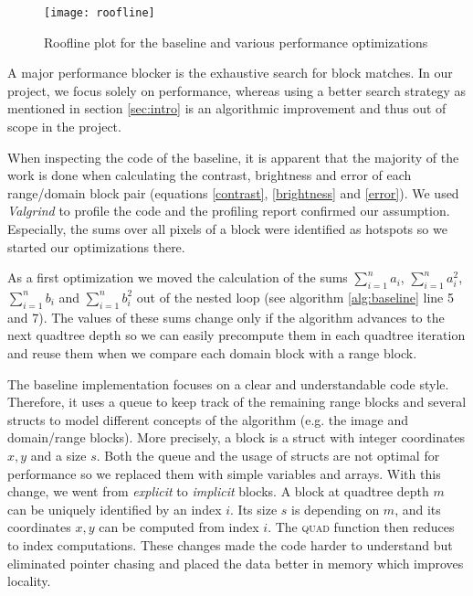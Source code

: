 \begin{figure}
  \texttt{[image: roofline]}
  \caption{Roofline plot for the baseline and various performance optimizations}
  \label{fig:roofline}
\end{figure}

 A major performance blocker is the exhaustive search for block matches.
In our project, we focus solely on performance,
whereas using a better search strategy as mentioned in section \ref{sec:intro} is an algorithmic improvement
and thus out of scope in the project.

When inspecting the code of the baseline, it is apparent that the majority of the work
is done when calculating the contrast, brightness and error of each range/domain block pair
(equations \ref{contrast}, \ref{brightness} and \ref{error}). We used \textit{Valgrind}
\cite{valgrind} to profile the code and the profiling report confirmed our assumption. Especially, the sums
over all pixels of a block were identified as hotspots so we started our optimizations there.

 As a first optimization we moved the calculation of the sums $\sum_{i=1}^n a_i$,
$\sum_{i=1}^n a_i^2$, $\sum_{i=1}^n b_i$ and $\sum_{i=1}^n b_i^2$ out of the nested loop
(see algorithm \ref{alg:baseline} line 5 and 7). The values of these sums change only if the algorithm advances
to the next quadtree depth so we can easily precompute them in each quadtree iteration and reuse them when we
compare each domain block with a range block.

The baseline implementation focuses on a clear and understandable code style. Therefore, it uses a queue
to keep track of the remaining range blocks and several structs to model different concepts of the algorithm
(e.g. the image and domain/range blocks). More precisely, a block is a struct with integer coordinates $x,y$ and a size $s$.
Both the queue and the usage of structs are not optimal for performance so we replaced them
with simple variables and arrays. With this change, we went from \textit{explicit} to \textit{implicit} blocks.
A block at quadtree depth $m$ can be uniquely identified by an index $i$. Its size $s$ is depending on $m$,
and its coordinates $x,y$ can be computed from index $i$. The \textsc{quad} function then reduces to index computations.
These changes made the code harder to understand but eliminated pointer chasing and placed the
data better in memory which improves locality.

